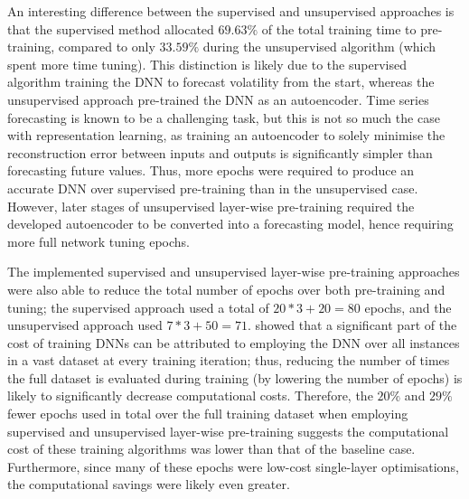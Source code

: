 \documentclass[a4paper, 11pt]{report}
\begin{document}
    An interesting difference between the supervised and unsupervised approaches is that the supervised method allocated $69.63\%$ of the total training time to pre-training, compared to only $33.59\%$ during the unsupervised algorithm (which spent more time tuning). This distinction is likely due to the supervised algorithm training the DNN to forecast volatility from the start, whereas the unsupervised approach pre-trained the DNN as an autoencoder. Time series forecasting is known to be a challenging task, but this is not so much the case with representation learning, as training an autoencoder to solely minimise the reconstruction error between inputs and outputs is significantly simpler than forecasting future values. Thus, more epochs were required to produce an accurate DNN over supervised pre-training than in the unsupervised case. However, later stages of unsupervised layer-wise pre-training required the developed autoencoder to be converted into a forecasting model, hence requiring more full network tuning epochs. 

    The implemented supervised and unsupervised layer-wise pre-training approaches were also able to reduce the total number of epochs over both pre-training and tuning; the supervised approach used a total of $20 * 3 + 20 = 80$ epochs, and the unsupervised approach used $7 * 3 + 50 = 71$. \citet{schwartz-2019} showed that a significant part of the cost of training DNNs can be attributed to employing the DNN over all instances in a vast dataset at every training iteration; thus, reducing the number of times the full dataset is evaluated during training (by lowering the number of epochs) is likely to significantly decrease computational costs. Therefore, the $20\%$ and $29\%$ fewer epochs used in total over the full training dataset when employing supervised and unsupervised layer-wise pre-training suggests the computational cost of these training algorithms was lower than that of the baseline case. Furthermore, since many of these epochs were low-cost single-layer optimisations, the computational savings were likely even greater. 
\end{document}
